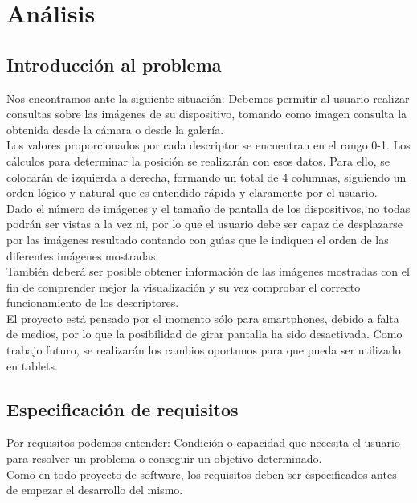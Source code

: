 \chapter{Análisis}
\label{cap:analisis}

\section{Introducción al problema}

Nos encontramos ante la siguiente situación: Debemos permitir al usuario realizar consultas sobre las imágenes de su dispositivo, tomando como imagen consulta la obtenida desde la cámara o desde la galería.\\

Los valores proporcionados por cada descriptor se encuentran en el rango 0-1. Los cálculos para determinar la posición se realizarán con esos datos. Para ello, se colocarán de izquierda a derecha, formando un total de 4 columnas, siguiendo un orden lógico y natural que es entendido rápida y claramente por el usuario.\\

Dado el número de imágenes y el tamaño de pantalla de los dispositivos, no todas podrán ser vistas a la vez ni, por lo que el usuario debe ser capaz de desplazarse por las imágenes resultado contando con guı́as que le indiquen el orden de las diferentes imágenes mostradas.\\

También deberá ser posible obtener información de las imágenes mostradas con el fin de comprender mejor la visualización y su vez comprobar el correcto funcionamiento de los descriptores.\\

El proyecto está pensado por el momento sólo para smartphones, debido a falta de medios, por lo que la posibilidad de girar pantalla ha sido desactivada. Como trabajo futuro, se realizarán los cambios oportunos para que pueda ser utilizado en tablets.

\section{Especificación de requisitos}

Por requisitos podemos entender: Condición o capacidad que necesita el usuario para resolver un problema o conseguir un objetivo determinado.\\

Como en todo proyecto de software, los requisitos deben ser especificados antes de empezar el desarrollo del mismo.\\

